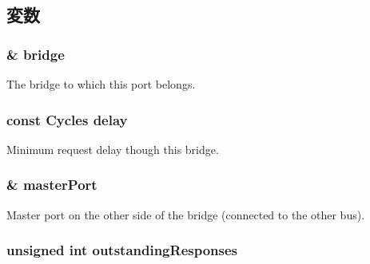 \subsection{変数}
\hypertarget{classBridge_1_1BridgeSlavePort_a6d3b24e49ac986064571195ab9905136}{
\subsubsection[{bridge}]{\& {\bf bridge}}}
\label{classBridge_1_1BridgeSlavePort_a6d3b24e49ac986064571195ab9905136}
The bridge to which this port belongs. \hypertarget{classBridge_1_1BridgeSlavePort_a153dd7cdfa9816427cbbe84dce923c8d}{
\subsubsection[{delay}]{\setlength{\rightskip}{0pt plus 5cm}const {\bf Cycles} {\bf delay}}}
\label{classBridge_1_1BridgeSlavePort_a153dd7cdfa9816427cbbe84dce923c8d}
Minimum request delay though this bridge. \hypertarget{classBridge_1_1BridgeSlavePort_ab67087190dd99cae7527467d6b6e7bbb}{
\subsubsection[{masterPort}]{\& {\bf masterPort}}}
\label{classBridge_1_1BridgeSlavePort_ab67087190dd99cae7527467d6b6e7bbb}
Master port on the other side of the bridge (connected to the other bus). \hypertarget{classBridge_1_1BridgeSlavePort_a3d6ba4ec7b15c09dd3e5d3c23c1f174f}{
\subsubsection[{outstandingResponses}]{\setlength{\rightskip}{0pt plus 5cm}unsigned int {\bf outstandingResponses}}}
